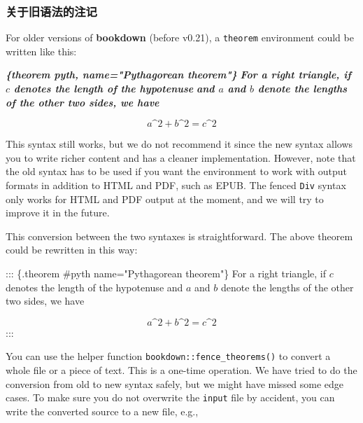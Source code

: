 \documentclass[
  12pt,
]{krantz}
\newenvironment{Shaded}{\begin{snugshade}}{\end{snugshade}}
\newcommand{\InformationTok}[1]{\textcolor[rgb]{0.56,0.35,0.01}{\textbf{\textit{#1}}}}
\newcommand{\NormalTok}[1]{#1}
\theoremstyle{definition}
\theoremstyle{definition}
\theoremstyle{definition}
\theoremstyle{definition}
\theoremstyle{remark}
\begin{document}
\hypertarget{theorem-engine}{%
\subsubsection{关于旧语法的注记}\label{theorem-engine}}

For older versions of \textbf{bookdown} (before v0.21), a \texttt{theorem} environment could be written like this:

\begin{Shaded}
\begin{Highlighting}[]
\InformationTok{\textasciigrave{}\textasciigrave{}\textasciigrave{}\{theorem pyth, name="Pythagorean theorem"\}}
\InformationTok{For a right triangle, if $c$ denotes the length of the hypotenuse}
\InformationTok{and $a$ and $b$ denote the lengths of the other two sides, we have}

\InformationTok{$$a\^{}2 + b\^{}2 = c\^{}2$$}
\InformationTok{\textasciigrave{}\textasciigrave{}\textasciigrave{}}
\end{Highlighting}
\end{Shaded}

This syntax still works, but we do not recommend it since the new syntax allows you to write richer content and has a cleaner implementation. However, note that the old syntax has to be used if you want the environment to work with output formats in addition to HTML and PDF, such as EPUB. The fenced \texttt{Div} syntax only works for HTML and PDF output at the moment, and we will try to improve it in the future.

This conversion between the two syntaxes is straightforward. The above theorem could be rewritten in this way:

\begin{Shaded}
\begin{Highlighting}[]
\NormalTok{::: \{.theorem \#pyth name="Pythagorean theorem"\}}
\NormalTok{For a right triangle, if $c$ denotes the length of the hypotenuse}
\NormalTok{and $a$ and $b$ denote the lengths of the other two sides, we have}

\NormalTok{$$a\^{}2 + b\^{}2 = c\^{}2$$}
\NormalTok{:::}
\end{Highlighting}
\end{Shaded}

You can use the helper function \texttt{bookdown::fence\_theorems()} to convert a whole file or a piece of text. This is a one-time operation. We have tried to do the conversion from old to new syntax safely, but we might have missed some edge cases. To make sure you do not overwrite the \texttt{input} file by accident, you can write the converted source to a new file, e.g.,
\end{document}
